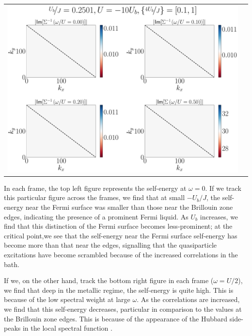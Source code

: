 \documentclass{report}
\numberwithin{equation}{section}
\begin{document}
{\begin{center}
\begin{tabular}{c|c}
\includegraphics[height=0.3\textheight]{../figures/sigma-4-Ub_by_J=0.25010-4.pdf}
\end{tabular}
\label{four-self}
\end{center}

In each frame, the top left figure represents the self-energy at \(\omega=0\). If we track this particular figure across the frames, we find that at small \(-U_b/J\), the self-energy near the Fermi surface was smaller than those near the Brillouin zone edges, indicating the presence of a prominent Fermi liquid. As \(U_b\) increases, we find that this distinction of the Fermi surface becomes less-prominent; at the critical point,we see that the self-energy near the Fermi surface self-energy has become more than that near the edges, signalling that the quasiparticle excitations have become scrambled because of the increased correlations in the bath.

If we, on the other hand, track the bottom right figure in each frame (\(\omega = U/2\)), we find that deep in the metallic regime, the self-energy is quite high. This is because of the low spectral weight at large \(\omega\). As the correlations are increased, we find that  this self-energy decreases, particular in comparison to the values at the Brillouin zone edges. This is because of the appearance of the Hubbard side-peaks in the local spectral function
.

}
\end{document}
